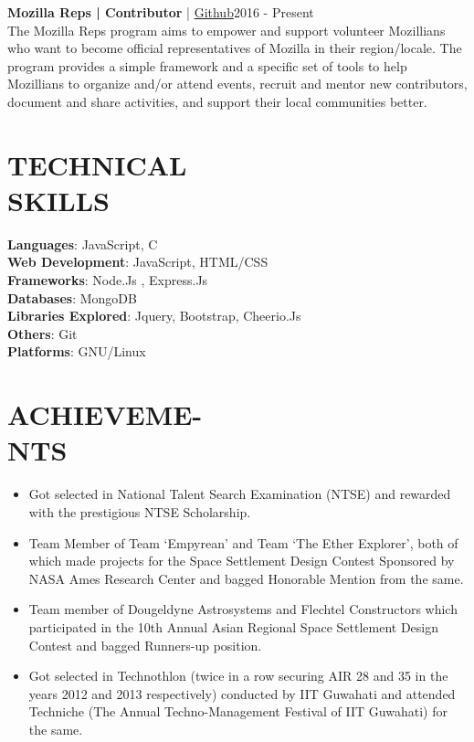 \documentclass[margin]{res}
\begin{document}
\begin{resume}
      \textbf{Mozilla Reps |  Contributor}  | \href{https://github.com/mozilla/remo/pulls/karanagarwal17}{ Github}\hfill 2016 - Present \\
      The Mozilla Reps program aims to empower and support volunteer Mozillians who want to become official representatives of Mozilla in their region/locale.
      The program provides a simple framework and a specific set of tools to help Mozillians to organize and/or attend events, recruit and mentor new contributors, document and share activities, and support their local communities better.

\section{TECHNICAL \\ SKILLS}
  {\textbf{Languages}:} JavaScript, C\\
	{\textbf{Web Development}:} JavaScript, HTML/CSS\\
  {\textbf{Frameworks}:} Node.Js , Express.Js\\
  {\textbf{Databases}:} MongoDB\\
  {\textbf{Libraries Explored}:} Jquery, Bootstrap, Cheerio.Js\\
  {\textbf{Others}:} Git\\
  {\textbf{Platforms}:} GNU/Linux

  \section{ACHIEVEME-\\NTS}
  \begin{itemize}  \itemsep -2pt %
      \item Got selected in National Talent Search Examination (NTSE) and rewarded with the prestigious NTSE Scholarship.
      \item Team Member of Team ‘Empyrean’ and Team ‘The Ether Explorer’, both of which made projects for the Space Settlement Design Contest Sponsored by NASA Ames Research Center and bagged Honorable Mention from the same.
      \item Team member of Dougeldyne Astrosystems and Flechtel Constructors which participated in the 10th Annual Asian Regional Space Settlement Design\\ Contest and bagged Runners-up position.
      \item Got selected in Technothlon (twice in a row securing AIR 28 and 35 in the years 2012 and 2013 respectively) conducted by IIT Guwahati and attended Techniche (The Annual Techno-Management Festival of IIT Guwahati) for the same.
  \end{itemize}


\end{resume}
\end{document}

